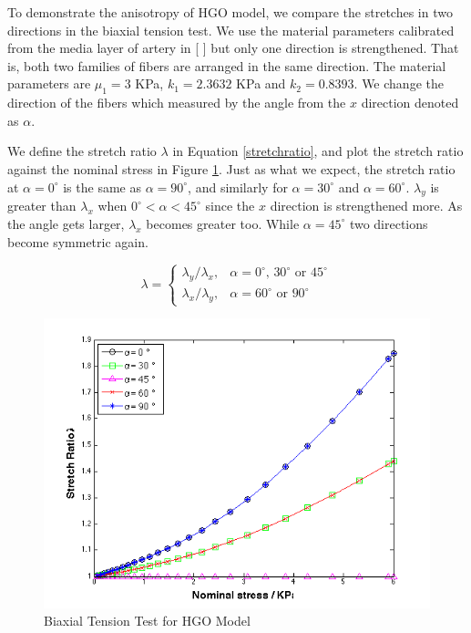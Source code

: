 To demonstrate the anisotropy of HGO model, we compare the stretches in two directions in the biaxial tension test. We use the material parameters calibrated from the media layer of artery in [ ] but only one direction is strengthened. That is, both two families of fibers are arranged in the same direction. The material parameters are $\mu_1 = 3$ KPa, $k_1 = 2.3632$ KPa and $k_2 = 0.8393$. We change the direction of the fibers which measured by the angle from the $x$ direction denoted as $\alpha$. 

We define the stretch ratio $\lambda$ in Equation \ref{stretchratio}, and plot the stretch ratio against the nominal stress in Figure \ref{fig:biaxial2}. Just as what we expect, the stretch ratio at $\alpha = 0^\circ$ is the same as $\alpha = 90^\circ$, and similarly for $\alpha = 30^\circ$ and $\alpha = 60^\circ$. 
$\lambda_y$ is greater than $\lambda_x$ when $0^\circ < \alpha < 45^\circ$ since the $x$ direction is strengthened more. As the angle gets larger, $\lambda_x$ becomes greater too. While $\alpha = 45^\circ$ two directions become symmetric again.

\begin{equation}
\label{stretchratio}
\lambda = 
\begin{cases}
	\lambda_y/\lambda_x, & \text{$\alpha = 0^\circ$, $30^\circ$ or $45^\circ$} \\
	\lambda_x/\lambda_y, & \text{$\alpha = 60^\circ$ or $90^\circ$}
\end{cases}
\end{equation}
 
\begin{figure}[h!]
\centering
\includegraphics[width=.6\textwidth]{./figures/biaxial2.png}
\caption{Biaxial Tension Test for HGO Model}
\label{fig:biaxial2}
\end{figure}

